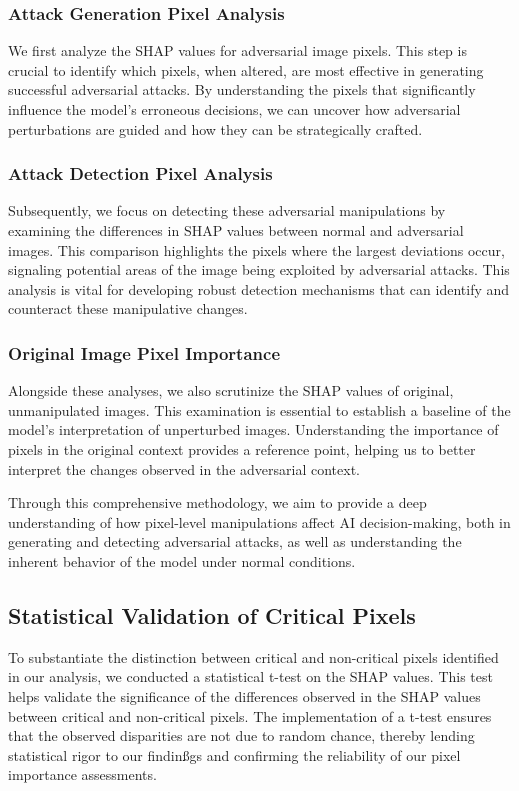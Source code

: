 \documentclass[10pt, conference, a4paper, final]{IEEEtran}
\begin{document}
 \subsubsection{Attack Generation Pixel Analysis}
We first analyze the SHAP values for adversarial image pixels. This step is crucial to identify which pixels, when altered, are most effective 
in generating successful adversarial attacks. By understanding the pixels that significantly influence the model's erroneous decisions, we can 
uncover how adversarial perturbations are guided and how they can be strategically crafted.

\subsubsection{Attack Detection Pixel Analysis}
Subsequently, we focus on detecting these adversarial manipulations by examining the differences in SHAP values between normal and adversarial
images. This comparison highlights the pixels where the largest deviations occur, signaling potential areas of the image being exploited by 
adversarial attacks. This analysis is vital for developing robust detection mechanisms that can identify and counteract these manipulative 
changes.

\subsubsection{Original Image Pixel Importance}
Alongside these analyses, we also scrutinize the SHAP values of original, unmanipulated images. This examination is essential to establish a 
baseline of the model’s interpretation of unperturbed images. Understanding the importance of pixels in the original context provides a 
reference point, helping us to better interpret the changes observed in the adversarial context.

Through this comprehensive methodology, we aim to provide a deep understanding of how pixel-level manipulations affect AI decision-making, 
both in generating and detecting adversarial attacks, as well as understanding the inherent behavior of the model under normal conditions.

\subsection{Statistical Validation of Critical Pixels}
To substantiate the distinction between critical and non-critical pixels identified in our analysis, we conducted a statistical t-test on the
 SHAP values. This test helps validate the significance of the differences observed in the SHAP values between critical and non-critical pixels.
  The implementation of a t-test ensures that the observed disparities are not due to random chance, thereby lending statistical rigor to our 
  findinßgs and confirming the reliability of our pixel importance assessments.
\end{document}
